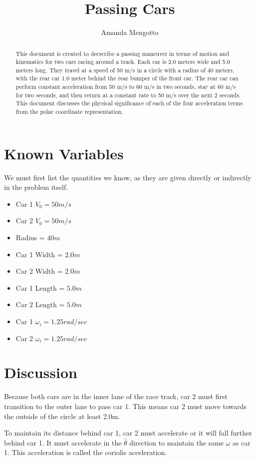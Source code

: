 \documentclass{article}
\begin{document}
\title{Passing Cars}
\author{Amanda Mengotto}
\maketitle

\begin{abstract}
This document is created to decscribe a passing maneuver in terms of motion and kinematics for two cars racing around a track. Each car is 2.0 meters wide and 5.0 meters long. They travel at a speed of 50 m/s in a circle with a radius of 40 meters, with the rear car 1.0 meter behind the rear bumper of the front car. The rear car can perform constant acceleration from 50 m/s to 60 m/s in two seconds, stay at 60 m/s for two seconds, and then return at a constant rate to 50 m/s over the next 2 seconds. This document discusses the physical significance of each of the four acceleration terms from the polar coordinate representation.
\end{abstract}
\section{Known Variables}
We must first list the quantities we know, as they are given directly or indirectly in the problem itself.
\begin{itemize}
\item Car 1 $V_0 = 50 m/s$
\item Car 2 $V_0 = 50 m/s$
\item Radius = $40m$
\item Car 1 Width = $2.0m$
\item Car 2 Width = $2.0m$
\item Car 1 Length = $5.0m$
\item Car 2 Length = $5.0m$
\item Car 1 $\omega_i = 1.25 rad/sec$
\item Car 2 $\omega_i = 1.25 rad/sec$
\end{itemize}

\section{Discussion}

Because both cars are in the inner lane of the race track, car 2 must first transition to the outer lane to pass car 1. This means car  2 must move towards the outside of the circle at least 2.0m.

To maintain its distance behind car 1, car 2 must accelerate or it will fall further behind car 1. It must accelerate in the $\hat{\theta}$ direction to maintain the same $\omega$ as car 1. This acceleration is called the coriolis acceleration. 
\end{document}
